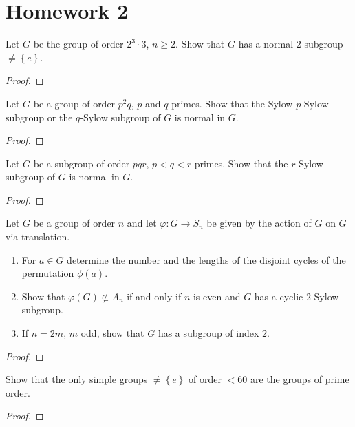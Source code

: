 \chapter{Homework 2}
\begin{problem}
Let $G$ be the group of order $2^3\cdot 3$, $n\geq 2$. Show that $G$ has a
normal $2$-subgroup $\neq\left\{e\right\}$.
\end{problem}
\begin{proof}
\end{proof}

\begin{problem}
Let $G$ be a group of order $p^2q$, $p$ and $q$ primes. Show that the Sylow
$p$-Sylow subgroup or the $q$-Sylow subgroup of $G$ is normal in $G$.
\end{problem}
\begin{proof}
\end{proof}

\begin{problem}
Let $G$ be a subgroup of order $pqr$, $p<q<r$ primes. Show that the
$r$-Sylow subgroup of $G$ is normal in $G$.
\end{problem}
\begin{proof}
\end{proof}

\begin{problem}
Let $G$ be a group of order $n$ and let $\varphi\colon G\to S_n$ be given by
the action of $G$ on $G$ via translation.
\begin{enumerate}[label=(\alph*)]
\item For $a\in G$ determine the number and the lengths of the disjoint
  cycles of the permutation $\phi(a)$.
\item Show that $\varphi(G)\nsubset A_n$ if and only if $n$ is even and $G$
  has a cyclic $2$-Sylow subgroup.
\item If $n=2m$, $m$ odd, show that $G$ has a subgroup of index $2$.
\end{enumerate}
\end{problem}
\begin{proof}
\end{proof}

\begin{problem}
Show that the only simple groups $\neq\left\{e\right\}$ of order $<60$ are
the groups of prime order.
\end{problem}
\begin{proof}
\end{proof}

